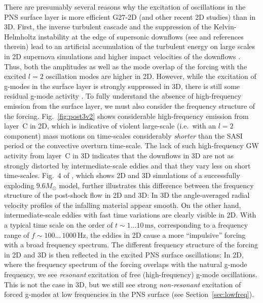 There are presumably several reasons why the excitation of
oscillations in the PNS surface layer is more efficient {\comment G27-2D (and other recent 2D studies) than in
3D.} First, the inverse turbulent cascade \citep{kraichnan_76} and the
suppression of the Kelvin-Helmholtz instability at the edge of
supersonic downflows (see \citealt{mueller_15b} and references
therein) lead to an artificial accumulation of the turbulent energy on
large scales in 2D supernova simulations \citep{hanke_12,abdikamalov_15} and
higher impact velocities of the downflows
\citep{melson_15a,mueller_15b}. Thus, both the amplitudes as well as
the mode overlap of the forcing with the excited $l=2$ oscillation modes are higher in 2D. 
However, while the excitation of g-modes in the surface layer is
strongly suppressed in 3D, there is still some residual g-mode
activity \citep{melson_15a,mueller_15b}.  
To fully understand the absence of high-frequency emission from the surface
layer, we must also consider the frequency structure of the forcing. 
Fig.~\ref{fig:post3v2} shows considerable high-frequency emission from layer~C in 2D,
which is indicative of violent large-scale (i.e.\ with an $l=2$ component)
mass motions on time-scales considerably \emph{shorter} than the SASI
period or the convective overturn time-scale. The lack of such high-frequency GW activity from layer~C
in 3D indicates that the downflows in 3D are not as strongly distorted by
intermediate-scale eddies and that they vary less on short time-scales.
Fig.~4 of \citet{melson_15a}, 
which shows 2D and 3D simulations of a successfully exploding $9.6 M_\odot$ model,
further illustrates this difference between the frequency structure of the post-shock flow in 2D and 3D:
In 3D the angle-averaged radial velocity profiles of the infalling 
material appear smooth. On the other hand, intermediate-scale eddies
with fast time variations are clearly visible in 2D.
With a typical time scale on the order of $t \sim 1\ldots 10 \, \mathrm{ms}$, corresponding to a 
frequency range of $f \sim 100 \ldots \,1000 \, \mathrm{Hz}$, the eddies in 2D cause a more 
``impulsive'' forcing with a broad frequency spectrum. 
The different frequency structure of the 
forcing in 2D and 3D is then reflected in the excited PNS surface oscillations:
In 2D, where the frequency spectrum of the forcing overlaps with the natural g-mode
frequency, we see \emph{resonant} excitation of free (high-frequency) g-mode oscillations. 
This is not the case in 3D, but we still see strong \emph{non-resonant}
excitation of forced g-modes at low frequencies in the PNS surface (see Section~\ref{sec:lowfreq}).

